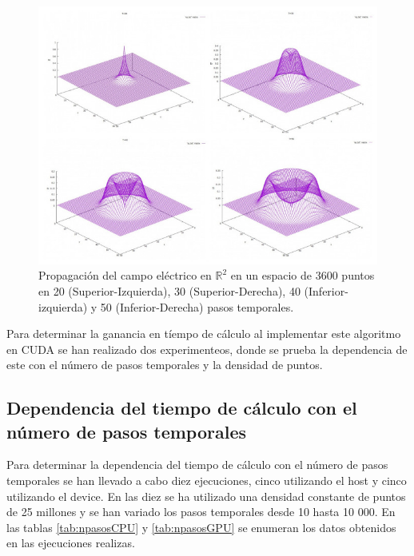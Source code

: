 \documentclass[11pt,a4paper,twoside,pdf]{article}
\numberwithin{equation}{section}
\begin{document}
\begin{figure}[h]
\centering
\includegraphics[width=15 cm]{Solution.JPG}				
\caption{Propagación del campo eléctrico en $\mathbb R^{2}$ en un espacio de 3600 puntos en 20 (Superior-Izquierda), 30 (Superior-Derecha), 40 (Inferior-izquierda) y 50 (Inferior-Derecha) pasos temporales.}
\label{fig:solucion}
\end{figure}
\noindent

Para determinar la ganancia en tíempo de cálculo al implementar este algoritmo en CUDA se han realizado dos experimenteos, donde se prueba la dependencia de este con el número de pasos temporales y la densidad de puntos.

\subsection{Dependencia del tiempo de cálculo con el número de pasos temporales}

Para determinar la dependencia del tiempo de cálculo con el número de pasos temporales se han llevado a cabo diez ejecuciones, cinco utilizando el host y cinco utilizando el device. En las diez se ha utilizado una densidad constante de puntos de 25 millones y se han variado los pasos temporales desde 10 hasta 10 000. En las tablas \ref{tab:npasosCPU} y \ref{tab:npasosGPU} se enumeran los datos obtenidos en las ejecuciones realizas.
\end{document}
